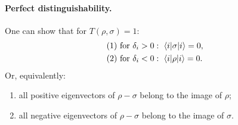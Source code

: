 \documentclass[11pt]{article}
\begin{document}
\paragraph{Perfect distinguishability.}
One can show that for $T(\rho,\sigma)=1$:
\[
\begin{aligned}
&\text{(1) for } \delta_i>0:\ \braket{i|\sigma|i}=0,\\
&\text{(2) for } \delta_i<0:\ \braket{i|\rho|i}=0.
\end{aligned}
\]
Or, equivalently:
\begin{enumerate}[label=(\arabic*), nosep]
  \item all positive eigenvectors of $\rho-\sigma$ belong to the image of $\rho$;
  \item all negative eigenvectors of $\rho-\sigma$ belong to the image of $\sigma$.
\end{enumerate}
\end{document}
